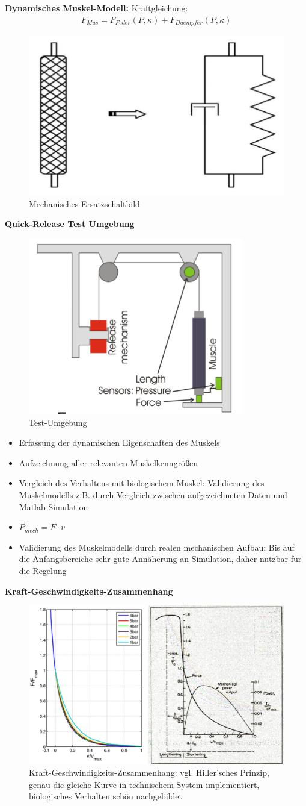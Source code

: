 \noindent
\textbf{Dynamisches Muskel-Modell:}
Kraftgleichung:
\begin{align*}
	F_{Mus} = F_{Feder}(P, \kappa) + F_{Daempfer}(P, \dot{\kappa})   
\end{align*}
\begin{figure}[h!]
	\centering
	\includegraphics[width=0.25\linewidth]{figures/ch03_dyn-modell.png}
	\caption{Mechanisches Ersatzschaltbild}
	\label{dm}
\end{figure}
\newpage
\noindent
\textbf{Quick-Release Test Umgebung}
\begin{figure}[h!]
	\centering
	\includegraphics[width=0.3\linewidth]{figures/ch03_testumgebung.png}
	\caption{Test-Umgebung}
	\label{tu}
\end{figure}
\begin{itemize}
	\item Erfassung der dynamischen Eigenschaften des Muskels
	\item Aufzeichnung aller relevanten Muskelkenngrößen
	\item Vergleich des Verhaltens mit biologischem Muskel: Validierung des Muskelmodells z.B. durch Vergleich zwischen aufgezeichneten Daten und Matlab-Simulation
	\item $P_{mech} = F \cdot v$
	\item Validierung des Muskelmodells durch realen mechanischen Aufbau: Bis auf die Anfangsbereiche sehr gute Annäherung an Simulation, daher nutzbar für die Regelung
\end{itemize}

\textbf{Kraft-Geschwindigkeits-Zusammenhang}
\begin{figure}[h!]
	\centering
	\includegraphics[width=0.8\linewidth]{figures/ch03_pv-zshang.png}
	\caption{Kraft-Geschwindigkeits-Zusammenhang: vgl. Hiller'sches Prinzip, genau die gleiche Kurve in technischem System implementiert, biologisches Verhalten schön nachgebildet}
	\label{tu}
\end{figure}

